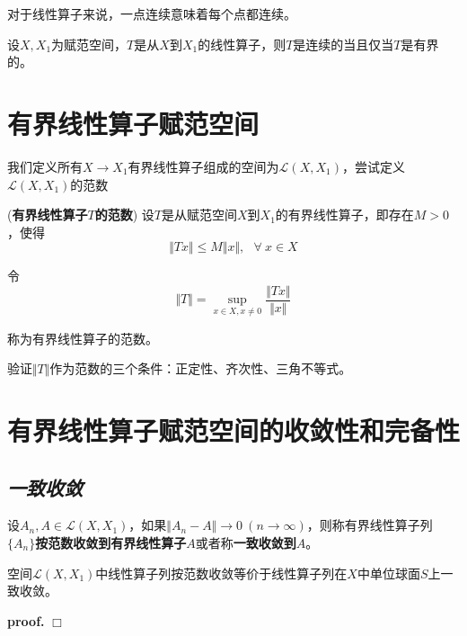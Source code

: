 对于线性算子来说，一点连续意味着每个点都连续。

\begin{mdframed}
    \begin{theorem}
        设$X,X_1$为赋范空间，$T$是从$X$到$X_1$的线性算子，则$T$是连续的当且仅当$T$是有界的。
    \end{theorem}
\end{mdframed}

\section{有界线性算子赋范空间}

我们定义所有$X\rightarrow X_1$有界线性算子组成的空间为$\mathcal{L}(X,X_1)$，尝试定义$\mathcal{L}(X,X_1)$的范数
\begin{mdframed}
    \begin{define}(\textbf{有界线性算子$T$的范数})
        设$T$是从赋范空间$X$到$X_1$的有界线性算子，即存在$M>0$，使得
        \begin{equation}
            \Vert Tx\Vert \leqslant M\Vert x\Vert,\ \ \ \forall\ x\in X
        \end{equation}

        令
        \begin{equation}
            \Vert T\Vert =\sup\limits_{
                 x\in X,
                 x\neq 0
           }\frac{\Vert Tx\Vert}{\Vert x\Vert}
        \end{equation}

        称为有界线性算子的范数。
    \end{define}
\end{mdframed}

验证$\Vert T\Vert$作为范数的三个条件：正定性、齐次性、三角不等式。

\section{有界线性算子赋范空间的收敛性和完备性}

\subsection*{\textsl{一致收敛}}
设$A_n,A\in \mathcal{L}(X,X_1)$，如果$\Vert A_n-A\Vert\rightarrow 0\ (n\rightarrow \infty)$，则称有界线性算子列$\{A_n\}$\textbf{按范数收敛到有界线性算子$A$}或者称\textbf{一致收敛到$A$}。

\begin{mdframed}
    \begin{theorem}
        空间$\mathcal{L}(X,X_1)$中线性算子列按范数收敛等价于线性算子列在$X$中单位球面$S$上一致收敛。
    \end{theorem}
\end{mdframed}
\textbf{proof.} $\Box$

